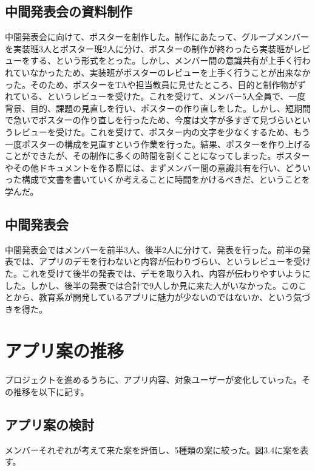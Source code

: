 \documentclass[openany,11pt,papersize]{jsbook}
\begin{document}

\subsection{中間発表会の資料制作}
\par 中間発表会に向けて、ポスターを制作した。制作にあたって、グループメンバーを実装班3人とポスター班2人に分け、ポスターの制作が終わったら実装班がレビューをする、という形式をとった。しかし、メンバー間の意識共有が上手く行われていなかったため、実装班がポスターのレビューを上手く行うことが出来なかった。そのため、ポスターをTAや担当教員に見せたところ、目的と制作物がずれている、というレビューを受けた。これを受けて、メンバー5人全員で、一度背景、目的、課題の見直しを行い、ポスターの作り直しをした。しかし、短期間で急いでポスターの作り直しを行ったため、今度は文字が多すぎて見づらいというレビューを受けた。これを受けて、ポスター内の文字を少なくするため、もう一度ポスターの構成を見直すという作業を行った。結果、ポスターを作り上げることができたが、その制作に多くの時間を割くことになってしまった。ポスターやその他ドキュメントを作る際には、まずメンバー間の意識共有を行い、どういった構成で文書を書いていくか考えることに時間をかけるべきだ、ということを学んだ。


\subsection{中間発表会}
\par 中間発表会ではメンバーを前半3人、後半2人に分けて、発表を行った。前半の発表では、アプリのデモを行わないと内容が伝わりづらい、というレビューを受けた。これを受けて後半の発表では、デモを取り入れ、内容が伝わりやすいようにした。しかし、後半の発表では合計で9人しか見に来た人がいなかった。このことから、教育系が開発しているアプリに魅力が少ないのではないか、という気づきを得た。


\section{アプリ案の推移}
\par プロジェクトを進めるうちに、アプリ内容、対象ユーザーが変化していった。その推移を以下に記す。

\subsection{アプリ案の検討}
\par メンバーそれぞれが考えて来た案を評価し、5種類の案に絞った。図3.4に案を表す。
\end{document}

